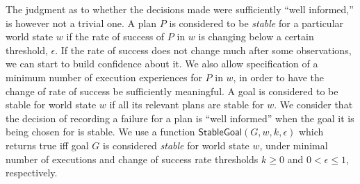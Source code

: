 \newcommand{\procedurefont}[1]{\mathsf{#1}}
\newcommand{\StableGoal}{\procedurefont{StableGoal}}
\newcommand{\RecordTrace}{\procedurefont{RecordFailedTrace}}
\newcommand{\RecordWorldDT}{\procedurefont{RecordWorldDT}}



The judgment as to whether the decisions made were sufficiently ``well
informed,'' is however not a trivial one.  A plan $P$ is considered to
be \emph{stable} for a particular world state $w$ if the rate of
success of $P$ in $w$ is changing below a certain threshold,
$\epsilon$.
If the rate of success does not change much after some
observations, we can start to build confidence about it.
We also allow specification of a minimum number of execution
experiences for $P$ in $w$, in order to have the change of rate of
success be sufficiently meaningful. A goal is considered to be stable
for world state $w$ if all its relevant plans are stable for $w$.  We
consider that the decision of recording a failure for a plan is ``well
informed'' when the goal it is being chosen for is stable.  We use a function
$\StableGoal(G,w,k,\epsilon)$ which returns true iff goal $G$ is
considered \textit{stable} for world state $w$, under minimal
 number of executions and change of success rate thresholds $k \geq 0$
 and $0 < \epsilon \leq 1$, respectively.

